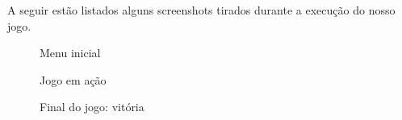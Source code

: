 \documentclass[rel_mlp]{iiufrgs}
\begin{document}
A seguir estão listados alguns screenshots tirados durante a execução do nosso jogo.

\begin{figure}[htb]
    \centering
    \caption{Menu inicial}
    \label{fig:figura1}
\end{figure}

\begin{figure}[htb]
    \centering
    \caption{Jogo em ação}
    \label{fig:figura1}
\end{figure}

\begin{figure}[htb]
    \centering
    \caption{Final do jogo: vitória}
    \label{fig:figura1}
\end{figure}
\end{document}
